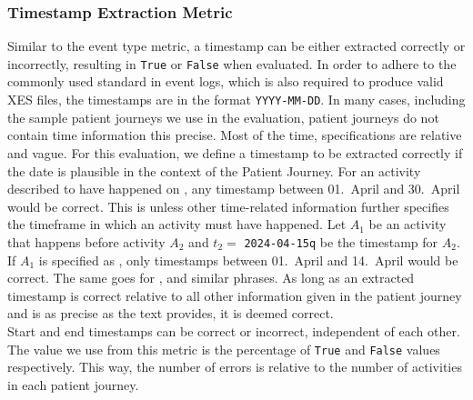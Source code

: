 \subsubsection{Timestamp Extraction Metric}\label{sec:time_metrics}
Similar to the event type metric, a timestamp can be either extracted correctly or incorrectly, resulting in \verb|True| or \verb|False| when evaluated. In order to adhere to the commonly used standard in event logs, which is also required to produce valid XES files, the timestamps are in the format \verb|YYYY-MM-DD|. In many cases, including the sample patient journeys we use in the evaluation, patient journeys do not contain time information this precise. Most of the time, specifications are relative and vague. For this evaluation, we define a timestamp to be extracted correctly if the date is plausible in the context of the Patient Journey. For an activity described to have happened on , any timestamp between 01.~April and 30.~April would be correct. This is unless other time-related information further specifies the timeframe in which an activity must have happened. Let $A_1$ be an activity that happens before activity $A_2$ and $t_2=$ \verb|2024-04-15q| be the timestamp for $A_2$. If $A_1$ is specified as , only timestamps between 01.~April and 14.~April would be correct. The same goes for ,  and similar phrases. As long as an extracted timestamp is correct relative to all other information given in the patient journey and is as precise as the text provides, it is deemed correct.\\
Start and end timestamps can be correct or incorrect, independent of each other. The value we use from this metric is the percentage of \verb|True| and \verb|False| values respectively. This way, the number of errors is relative to the number of activities in each patient journey.

